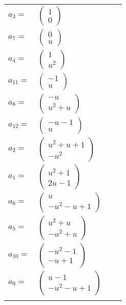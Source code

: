 \documentclass[1p]{elsarticle_modified}
\theoremstyle{definition}
\begin{document}
\begin{tabular}{m{7pt} m{180pt} m{7pt} m{180pt} }
\flushright $a_{3}=$&$\begin{pmatrix}1\\0\end{pmatrix}$ \\
\flushright $a_{7}=$&$\begin{pmatrix}0\\u\end{pmatrix}$ \\
\flushright $a_{4}=$&$\begin{pmatrix}1\\u^2\end{pmatrix}$ \\
\flushright $a_{11}=$&$\begin{pmatrix}-1\\u\end{pmatrix}$ \\
\flushright $a_{8}=$&$\begin{pmatrix}- u\\u^2+u\end{pmatrix}$ \\
\flushright $a_{12}=$&$\begin{pmatrix}- u-1\\u\end{pmatrix}$ \\
\flushright $a_{2}=$&$\begin{pmatrix}u^2+u+1\\- u^2\end{pmatrix}$ \\
\flushright $a_{1}=$&$\begin{pmatrix}u^2+1\\2 u-1\end{pmatrix}$ \\
\flushright $a_{6}=$&$\begin{pmatrix}u\\- u^2- u+1\end{pmatrix}$ \\
\flushright $a_{5}=$&$\begin{pmatrix}u^2+u\\- u^2+u\end{pmatrix}$ \\
\flushright $a_{10}=$&$\begin{pmatrix}- u^2-1\\- u+1\end{pmatrix}$ \\
\flushright $a_{9}=$&$\begin{pmatrix}u-1\\- u^2- u+1\end{pmatrix}$\\&\end{tabular}
\end{document}
